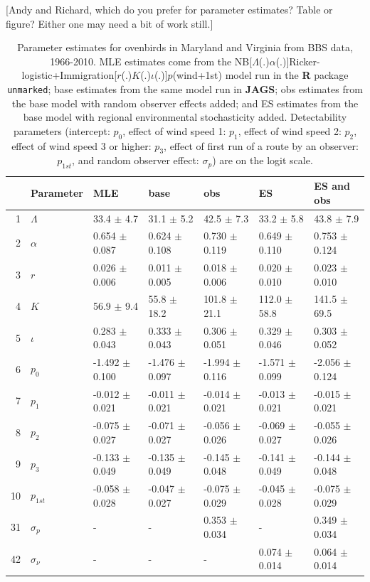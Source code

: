 \documentclass{article}
\begin{document}
[Andy and Richard, which do you prefer for parameter estimates?  
Table or figure?  Either one may need a bit of work still.]
\begin{table}[ht]
\centering
  \caption{Parameter estimates for ovenbirds in Maryland and Virginia from BBS data, 1966-2010.  
MLE estimates come from the NB[$\Lambda$(.)$\alpha$(.)]Ricker-logistic+Immigration[$r$(.)$K$(.)$\iota$(.)]$p$(wind+1st) 
model run in the \textbf{R} package \texttt{unmarked}; base estimates from the same model run in \textbf{JAGS};
obs estimates from the base model with random observer effects added; and ES estimates from the base
model with regional environmental stochasticity added.  Detectability parameters (intercept: $p_{0}$, 
effect of wind speed 1: $p_{1}$, effect of wind speed 2: $p_{2}$, effect of wind speed 3 or higher: $p_{3}$, 
effect of first run of a route by an observer: $p_{1st}$, and random observer effect: $\sigma_{p}$) are on the 
logit scale.}
\begin{tabular}{rllllll}
  \hline
 & Parameter & MLE & base & obs & ES & ES and obs \\ 
  \hline
1 & $\Lambda$ & 33.4 $\pm$ 4.7 & 31.1 $\pm$ 5.2 & 42.5 $\pm$ 7.3 & 33.2 $\pm$ 5.8 & 43.8 $\pm$ 7.9 \\ 
  2 & $\alpha$ & 0.654 $\pm$ 0.087 & 0.624 $\pm$ 0.108 & 0.730 $\pm$ 0.119 & 0.649 $\pm$ 0.110 & 0.753 $\pm$ 0.124 \\ 
  3 & $r$ & 0.026 $\pm$ 0.006 & 0.011 $\pm$ 0.005 & 0.018 $\pm$ 0.006 & 0.020 $\pm$ 0.010 & 0.023 $\pm$ 0.010 \\ 
  4 & $K$ & 56.9 $\pm$ 9.4 & 55.8 $\pm$ 18.2 & 101.8 $\pm$ 21.1 & 112.0 $\pm$ 58.8 & 141.5 $\pm$ 69.5 \\ 
  5 & $\iota$ & 0.283 $\pm$ 0.043 & 0.333 $\pm$ 0.043 & 0.306 $\pm$ 0.051 & 0.329 $\pm$ 0.046 & 0.303 $\pm$ 0.052 \\ 
  6 & $p_{0}$ & -1.492 $\pm$ 0.100 & -1.476 $\pm$ 0.097 & -1.994 $\pm$ 0.116 & -1.571 $\pm$ 0.099 & -2.056 $\pm$ 0.124 \\ 
  7 & $p_{1}$ & -0.012 $\pm$ 0.021 & -0.011 $\pm$ 0.021 & -0.014 $\pm$ 0.021 & -0.013 $\pm$ 0.021 & -0.015 $\pm$ 0.021 \\ 
  8 & $p_{2}$ & -0.075 $\pm$ 0.027 & -0.071 $\pm$ 0.027 & -0.056 $\pm$ 0.026 & -0.069 $\pm$ 0.027 & -0.055 $\pm$ 0.026 \\ 
  9 & $p_{3}$ & -0.133 $\pm$ 0.049 & -0.135 $\pm$ 0.049 & -0.145 $\pm$ 0.048 & -0.141 $\pm$ 0.049 & -0.144 $\pm$ 0.048 \\ 
  10 & $p_{1st}$ & -0.058 $\pm$ 0.028 & -0.047 $\pm$ 0.027 & -0.075 $\pm$ 0.029 & -0.045 $\pm$ 0.028 & -0.075 $\pm$ 0.029 \\ 
  31 & $\sigma_{p}$ & - & - & 0.353 $\pm$ 0.034 & - & 0.349 $\pm$ 0.034 \\ 
  42 & $\sigma_{\nu}$ & - & - & - & 0.074 $\pm$ 0.014 & 0.064 $\pm$ 0.014 \\ 
   \hline
\end{tabular}
\end{table}
\end{document}
